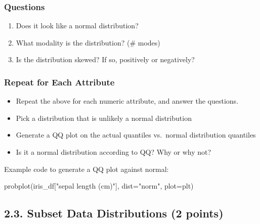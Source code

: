 \documentclass[
  letterpaper,
]{scrbook}
\newenvironment{Shaded}{\begin{snugshade}}{\end{snugshade}}
\newcommand{\NormalTok}[1]{\textcolor[rgb]{0.00,0.23,0.31}{#1}}
\newcommand{\OperatorTok}[1]{\textcolor[rgb]{0.37,0.37,0.37}{#1}}
\newcommand{\StringTok}[1]{\textcolor[rgb]{0.13,0.47,0.30}{#1}}
\providecommand{\tightlist}{%
  \setlength{\itemsep}{0pt}\setlength{\parskip}{0pt}}
\begin{document}
\subsubsection*{Questions}\label{questions}

\begin{enumerate}
\def\labelenumi{\arabic{enumi}.}
\tightlist
\item
  Does it look like a normal distribution?
\item
  What modality is the distribution? (\# modes)
\item
  Is the distribution skewed? If so, positively or negatively?
\end{enumerate}

\subsubsection*{Repeat for Each
Attribute}\label{repeat-for-each-attribute}

\begin{itemize}
\tightlist
\item
  Repeat the above for each numeric attribute, and answer the questions.
\item
  Pick a distribution that is unlikely a normal distribution
\item
  Generate a QQ plot on the actual quantiles vs.~normal distribution
  quantiles
\item
  Is it a normal distribution according to QQ? Why or why not?
\end{itemize}

Example code to generate a QQ plot against normal:

\begin{Shaded}
\begin{Highlighting}[]
\NormalTok{probplot(iris\_df[}\StringTok{"sepal length (cm)"}\NormalTok{], dist}\OperatorTok{=}\StringTok{"norm"}\NormalTok{, plot}\OperatorTok{=}\NormalTok{plt)}
\end{Highlighting}
\end{Shaded}

\subsection*{2.3. Subset Data Distributions (2
points)}\label{subset-data-distributions-2-points}
\end{document}

